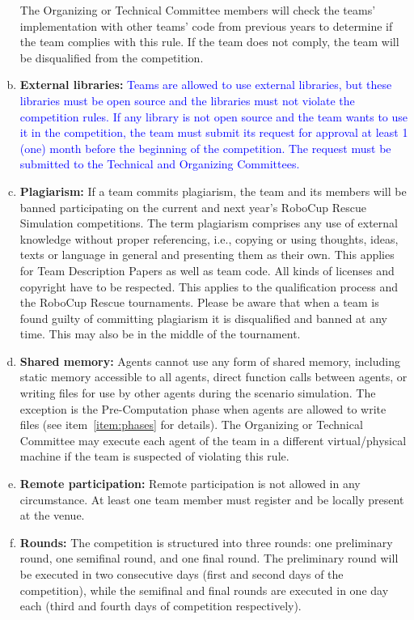 \documentclass{article}
\begin{document}
\begin{enumerate}[(a)]
The Organizing or Technical Committee members will check the teams' implementation with other teams' code from previous years to determine if the team complies with this rule. If the team does not comply, the team will be disqualified from the competition.
\item \textbf{External libraries:} \textcolor{blue}{Teams are allowed to use external libraries, but these libraries must be open source and the libraries must not violate the competition rules. If any library is not open source and the team wants to use it in the competition, the team must submit its request for approval at least 1 (one) month before the beginning of the competition. The request must be submitted to the Technical and Organizing Committees.}
\item \textbf{Plagiarism:} If a team commits plagiarism, the team and its members will be banned participating on the current and next year's RoboCup Rescue Simulation competitions. The term plagiarism comprises any use of external knowledge without proper referencing, i.e., copying or using thoughts, ideas, texts or language in general and presenting them as their own. This applies for Team Description Papers as well as team code. All kinds of licenses and copyright have to be respected. This applies to the qualification process and the RoboCup Rescue tournaments. Please be aware that when a team is found guilty of committing plagiarism it is disqualified and banned at any time. This may also be in the middle of the tournament.
\item \textbf{Shared memory:} Agents cannot use any form of shared memory, including static memory accessible to all agents, direct function calls between agents, or writing files for use by other agents during the scenario simulation. The exception is the Pre-Computation phase when agents are allowed to write files (see item~\ref{item:phases} for details). The Organizing or Technical Committee may execute each agent of the team in a different virtual/physical machine if the team is suspected of violating this rule.
\item \textbf{Remote participation:} Remote participation is not allowed in any circumstance. At least one team member must register and be locally present at the venue.
\item \textbf{Rounds:} The competition is structured into three rounds: one preliminary round, one semifinal round, and one final round. The preliminary round will be executed in two consecutive days (first and second days of the competition), while the semifinal and final rounds are executed in one day each (third and fourth days of competition respectively).

\end{enumerate}
\end{document}
